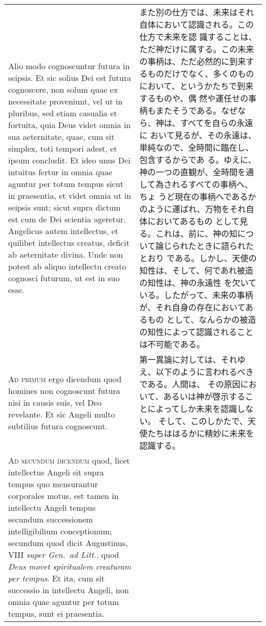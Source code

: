 \documentclass[10pt]{jsarticle} %
\begin{document}
\begin{longtable}{p{21em}p{21em}}
\\

Alio modo cognoscuntur futura in seipsis. Et sic solius Dei est futura
cognoscere, non solum quae ex necessitate proveniunt, vel ut in
pluribus, sed etiam casualia et fortuita, quia Deus videt omnia in sua
aeternitate, quae, cum sit simplex, toti tempori adest, et ipsum
concludit. Et ideo unus Dei intuitus fertur in omnia quae aguntur per
totum tempus sicut in praesentia, et videt omnia ut in seipsis sunt;
sicut supra dictum est cum de Dei scientia ageretur. Angelicus autem
intellectus, et quilibet intellectus creatus, deficit ab aeternitate
divina. Unde non potest ab aliquo intellectu creato cognosci futurum,
ut est in suo esse.


&

また別の仕方では、未来はそれ自体において認識される。この仕方で未来を認
識することは、ただ神だけに属する。この未来の事柄は、ただ必然的に到来す
るものだけでなく、多くのものにおいて、というかたちで到来するものや、偶
然や運任せの事柄もまたそうである。なぜなら、神は、すべてを自らの永遠に
おいて見るが、その永遠は、単純なので、全時間に臨在し、包含するからであ
る。ゆえに、神の一つの直観が、全時間を通して為されるすべての事柄へ、ちょ
うど現在の事柄へであるかのように運ばれ、万物をそれ自体においてあるもの
として見る。これは、前に、神の知について論じられたときに語られたとおり
である。しかし、天使の知性は、そして、何であれ被造の知性は、神の永遠性
を欠いている。したがって、未来の事柄が、それ自身の存在においてあるもの
として、なんらかの被造の知性によって認識されることは不可能である。


\\


{\scshape Ad primum} ergo dicendum quod homines non cognoscunt futura
nisi in causis suis, vel Deo revelante. Et sic Angeli multo subtilius
futura cognoscunt.

&

第一異論に対しては、それゆえ、以下のように言われるべきである。人間は、
その原因において、あるいは神が啓示することによってしか未来を認識しない。
そして、このしかたで、天使たちははるかに精妙に未来を認識する。

\\


{\scshape Ad secundum dicendum} quod, licet intellectus Angeli sit
supra tempus quo mensurantur corporales motus, est tamen in intellectu
Angeli tempus secundum successionem intelligibilium conceptionum;
secundum quod dicit Augustinus, VIII {\itshape super Gen.~ad Litt.},
quod {\itshape Deus movet spiritualem creaturam per tempus}. Et ita,
cum sit successio in intellectu Angeli, non omnia quae aguntur per
totum tempus, sunt ei praesentia.


\end{longtable}
\end{document}
